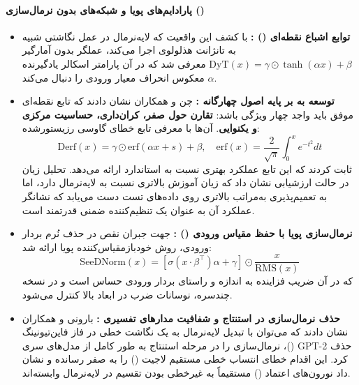 \paragraph*{پارادایم‌های پویا و شبکه‌های بدون نرمال‌سازی ()}
\begin{itemize}
    \item \textbf{توابع اشباع نقطه‌ای () \cite{zhu2025transformers}:} با کشف این واقعیت که لایه‌نرمال در عمل نگاشتی شبیه به تانژانت هذلولوی اجرا می‌کند، عملگر بدون آمارگیر $\text{DyT}(x) = \gamma \odot \tanh(\alpha x) + \beta$ معرفی شد که در آن پارامتر اسکالر یادگیرنده $\alpha$ معکوس انحراف معیار ورودی را دنبال می‌کند.
    \item \textbf{توسعه به  بر پایه اصول چهارگانه \cite{chen2026stronger}:} چن و همکاران نشان دادند که تابع نقطه‌ای موفق باید واجد چهار ویژگی باشد: \textbf{تقارن حول صفر، کران‌داری، حساسیت مرکزی و یکنوایی}. آن‌ها با معرفی تابع خطای گاوسی رزیستورشده:
    \begin{equation}
        \text{Derf}(x) = \gamma \odot \text{erf}(\alpha x + s) + \beta, \quad \text{erf}(x) = \frac{2}{\sqrt{\pi}}\int_0^x e^{-t^2} dt
    \end{equation}
    ثابت کردند که این تابع عملکرد بهتری نسبت به  استاندارد ارائه می‌دهد. تحلیل زیان در حالت ارزشیابی نشان داد که  زیان آموزش بالاتری نسبت به لایه‌نرمال دارد، اما به تعمیم‌پذیری به‌مراتب بالاتری روی داده‌های تست دست می‌یابد که نشانگر عملکرد آن به عنوان یک تنظیم‌کننده ضمنی قدرتمند است.
    \item \textbf{نرمال‌سازی پویا با حفظ مقیاس ورودی () \cite{cai2026seednorm}:} جهت جبران نقص  در حذف نُرم بردار ورودی، روش خودبازمقیاس‌کننده پویا ارائه شد:
    \begin{equation}
        \text{SeeDNorm}(x) = \left[ \sigma(x \cdot \beta^\top)\alpha + \gamma \right] \odot \frac{x}{\text{RMS}(x)}
    \end{equation}
    که در آن ضریب فزاینده به اندازه و راستای بردار ورودی حساس است و در نسخه چندسره، نوسانات ضرب در ابعاد بالا کنترل می‌شود.
    \item \textbf{حذف نرمال‌سازی در استنتاج و شفافیت مدارهای تفسیری \cite{baroni2025transformers}:} بارونی و همکاران نشان دادند که می‌توان با تبدیل لایه‌نرمال به یک نگاشت خطی در فاز فاین‌تیونینگ ()، نرمال‌سازی را در مرحله استنتاج به طور کامل از مدل‌های سری GPT-2 حذف کرد. این اقدام خطای انتساب خطی مستقیم لاجیت () را به صفر رسانده و نشان داد نورون‌های اعتماد () مستقیماً به غیرخطی بودن تقسیم در لایه‌نرمال وابسته‌اند.

\end{itemize}
